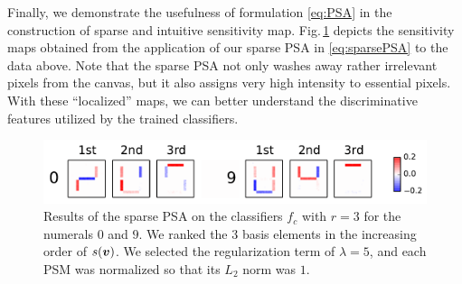 Finally, we demonstrate the usefulness of formulation \eqref{eq:PSA} in
the construction of sparse and intuitive sensitivity map.
%
Fig.\,\ref{fig:spsm_digit} depicts the sensitivity maps obtained from the
application of our sparse PSA in \eqref{eq:sparsePSA} to the data above.
%
Note that the sparse PSA not only washes away rather irrelevant
pixels from the canvas, but it also assigns very high intensity to essential pixels.
%
With these ``localized'' maps, we can better understand the discriminative features
utilized by the trained classifiers.
\begin{figure}[htbp]
 \centering
 \includegraphics[width=0.8\columnwidth]{./fig/fig4.pdf}
 \caption{
 Results of the sparse PSA on the classifiers $f_c$ with $r =
 3$ for the numerals $0$ and $9$.
 We ranked the $3$ basis elements in the increasing order of $s(\mbox{\boldmath $v$})$.
 We selected the regularization term of  $\lambda = 5$,
 and each PSM was normalized so that its $L_2$ norm was $1$.
 }
 \label{fig:spsm_digit}
\end{figure}

